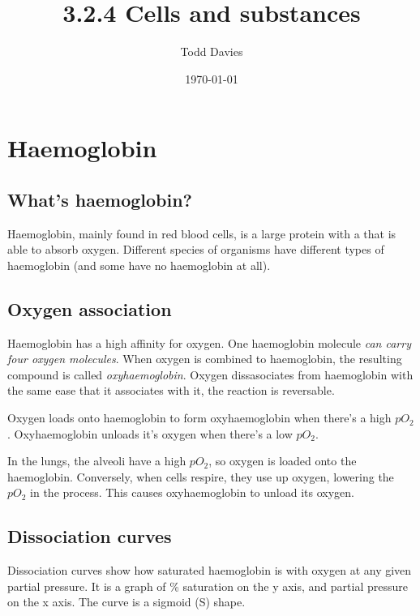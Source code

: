 \documentclass{article}
\author{Todd Davies}
\title{3.2.4 Cells and substances}
\date{\today}
\begin{document}
\lhead{\today}

\maketitle

\section*{Haemoglobin}
\thispagestyle{empty}

\subsection*{What's haemoglobin?}

Haemoglobin, mainly found in red blood cells, is a large protein with a
 that is able to absorb
oxygen. Different species of organisms have different types of haemoglobin (and
some have no haemoglobin at all).

\subsection*{Oxygen association}

Haemoglobin has a high affinity for oxygen. One haemoglobin molecule {\it can
carry four oxygen molecules}. When oxygen is combined to haemoglobin, the
resulting compound is called {\it oxyhaemoglobin}. Oxygen dissasociates from
haemo\-globin with the same ease that it associates with it, the reaction is
reversable.


Oxygen loads onto haemoglobin to form oxyhaemoglobin when there's a high $pO_2$.
Oxyhaemoglobin unloads it's oxygen when there's a low $pO_2$.

In the lungs, the alveoli have a high $pO_2$, so oxygen is loaded onto the
haemoglobin. Conversely, when cells respire, they use up oxygen, lowering the
$pO_2$ in the process. This causes oxyhaemoglobin to unload its oxygen.

\subsection*{Dissociation curves}

Dissociation curves show how saturated haemoglobin is with oxygen at any given
partial pressure. It is a graph of \% saturation on the y axis, and partial
pressure on the x axis. The curve is a sigmoid (S) shape.
\end{document}
